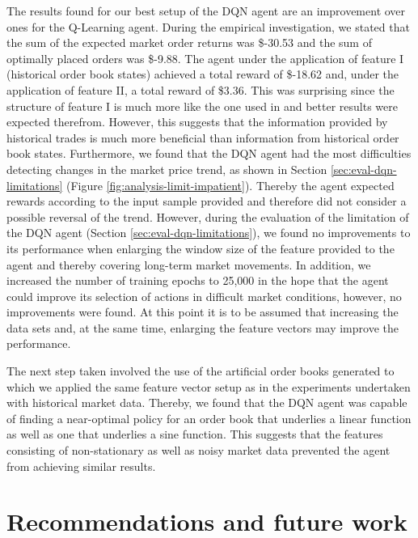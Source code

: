     The results found for our best setup of the DQN agent are an improvement over ones for the Q-Learning agent.
    During the empirical investigation, we stated that the sum of the expected market order returns was \$-30.53 and the sum of optimally placed orders was \$-9.88.
    The agent under the application of feature I (historical order book states) achieved a total reward of \$-18.62 and, under the application of feature II, a total reward of \$3.36.
    This was surprising since the structure of feature I is much more like the one used in \cite{mnih2013playing} and better results were expected therefrom.
    However, this suggests that the information provided by historical trades is much more beneficial than information from historical order book states.
    Furthermore, we found that the DQN agent had the most difficulties detecting changes in the market price trend, as shown in Section \ref{sec:eval-dqn-limitations} (Figure \ref{fig:analysis-limit-impatient}).
    Thereby the agent expected rewards according to the input sample provided and therefore did not consider a possible reversal of the trend.
    However, during the evaluation of the limitation of the DQN agent (Section \ref{sec:eval-dqn-limitations}), we found no improvements to its performance when enlarging the window size of the feature provided to the agent and thereby covering long-term market movements.
    In addition, we increased the number of training epochs to 25,000 in the hope that the agent could improve its selection of actions in difficult market conditions, however, no improvements were found.
    At this point it is to be assumed that increasing the data sets and, at the same time, enlarging the feature vectors may improve the performance.
    
    The next step taken involved the use of the artificial order books generated to which we applied the same feature vector setup as in the experiments undertaken with historical market data.
    Thereby, we found that the DQN agent was capable of finding a near-optimal policy for an order book that underlies a linear function as well as one that underlies a sine function.
    This suggests that the features consisting of non-stationary as well as noisy market data prevented the agent from achieving similar results.

\section{Recommendations and future work}

